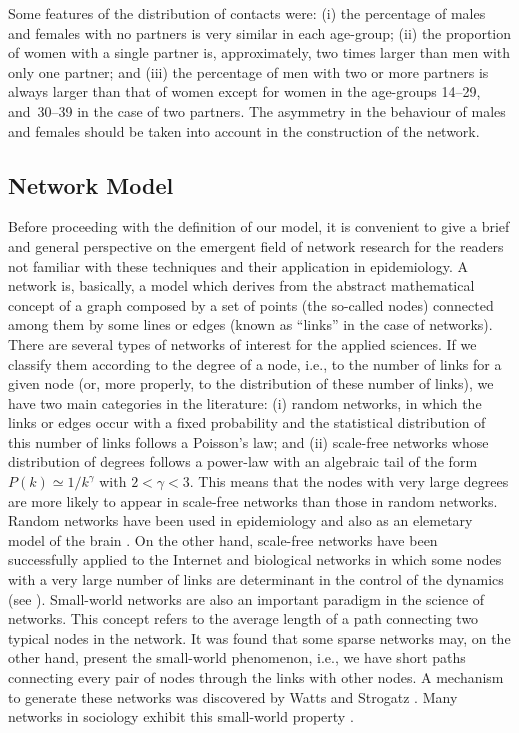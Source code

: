Some features of the distribution of contacts were: (i) the percentage of males and females with no partners is
very similar in each age-group; (ii) the proportion of women  with a single partner is, approximately, two times larger than men with only one partner; and (iii) the percentage of men with two or more partners is always larger than that of women except for women in the age-groups 14--29, and~30--39 in the case of two partners. The asymmetry in the behaviour of males and females should be taken into account in the construction of the network.

\subsection{Network Model}

Before proceeding with the definition of our model, it is convenient to give a brief and general perspective on the emergent field
of network research for the readers not familiar with these techniques and their application in epidemiology. A network is, basically, a model which derives from the abstract mathematical concept of a graph composed by a set of points (the so-called nodes) connected among them by some lines or edges (known as ``links'' in the case of networks).
There are several types of networks of interest for the applied sciences. If we classify them according to the degree of a node, i.e., to the number of links for a given node (or, more properly, to the distribution of these number of links), we have two main categories in the literature: (i) random networks, in which the links or edges occur with a fixed probability and the statistical distribution of this number of links follows a Poisson's law; and (ii) scale-free networks whose distribution of degrees follows a power-law with an
algebraic tail of the form $P(k) \simeq 1/k^\gamma$ with $2 < \gamma < 3$. This means that the nodes with very large degrees are more likely to appear in scale-free networks than those in random networks. Random networks have been used in epidemiology
\cite{RSV} and also as an elemetary model of the brain \cite{Acedo2013}. On the other hand, scale-free networks have been successfully applied to the Internet and biological networks in which some nodes with a very large number of links are determinant in the control of the dynamics (see \cite{Dorogovtsev}). Small-world networks are also an important paradigm in the 
science of networks. This concept refers to the average length of a path connecting two typical nodes in the network. It was found that some sparse networks may, on the other hand, present the small-world phenomenon, i.e., we have short paths connecting every pair of nodes through the links with other nodes. A mechanism to generate these networks was discovered by
Watts and Strogatz \cite{Watts}. Many networks in sociology exhibit this small-world property \cite{Obesity,Web,Bearman}.

